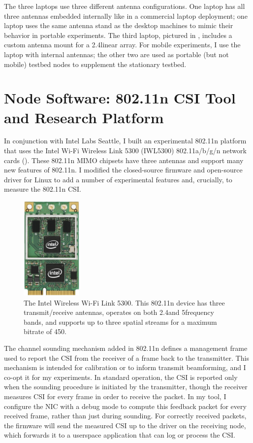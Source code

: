 The three laptops use three different antenna configurations. One laptop has all three antennas embedded internally like in a commercial laptop deployment; one laptop uses the same antenna stand as the desktop machines to mimic their behavior in portable experiments. The third laptop, pictured in , includes a custom antenna mount for a 2.4\GHz linear array. For mobile experiments, I use the laptop with internal antennas; the other two are used as portable (but not mobile) testbed nodes to supplement the stationary testbed.

\section{Node Software: 802.11n CSI Tool and Research Platform}
\label{sec:platform}
In conjunction with Intel Labs Seattle, I built an experimental 802.11n platform that uses the Intel Wi-Fi Wireless Link 5300 (IWL5300) 802.11a/b/g/n network cards (). These 802.11n MIMO chipsets have three antennas and support many new features of 802.11n. I modified the closed-source firmware and open-source  driver for Linux to add a number of experimental features and, crucially, to measure the 802.11n CSI.

\begin{figure}
	\centering
	\includegraphics[height=2in]{figures/tool/iwlwifi-5300.jpg}
	\caption[The Intel Wireless Wi-Fi Link 5300]{\label{fig:iwl5300}The Intel Wireless Wi-Fi Link 5300. This 802.11n device has three transmit/receive antennas, operates on both 2.4\GHz and 5\GHz frequency bands, and supports up to three spatial streams for a maximum bitrate of 450\Mbps.}
\end{figure}

 The channel sounding mechanism added in 802.11n defines a management frame used to report the CSI from the receiver of a frame back to the transmitter. This mechanism is intended for calibration or to inform transmit beamforming, and I co-opt it for my experiments. In standard operation, the CSI is reported only when the sounding procedure is initiated by the transmitter, though the receiver measures CSI for every frame in order to receive the packet. In my tool, I configure the NIC with a debug mode to compute this feedback packet for every received frame, rather than just during sounding. For correctly received packets, the firmware will send the measured CSI up to the driver on the receiving node, which forwards it to a userspace application that can log or process the CSI.

